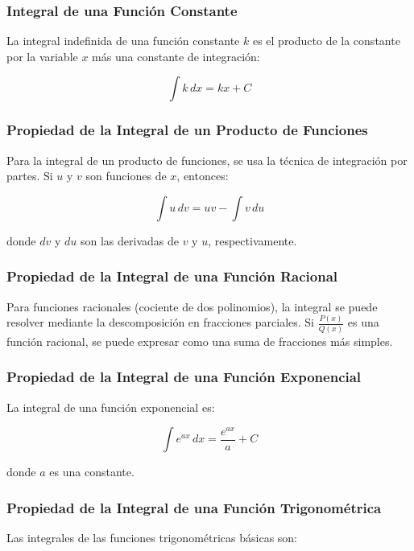 \subsubsection{Integral de una Función Constante}

La integral indefinida de una función constante \( k \) es el producto de la constante por la variable \( x \) más una constante de integración:

\[
\int k \, dx = kx + C
\]

\subsubsection{Propiedad de la Integral de un Producto de Funciones}

Para la integral de un producto de funciones, se usa la técnica de integración por partes. Si \( u \) y \( v \) son funciones de \( x \), entonces:

\[
\int u \, dv = uv - \int v \, du
\]

donde \( dv \) y \( du \) son las derivadas de \( v \) y \( u \), respectivamente.

\subsubsection{Propiedad de la Integral de una Función Racional}

Para funciones racionales (cociente de dos polinomios), la integral se puede resolver mediante la descomposición en fracciones parciales. Si \( \frac{P(x)}{Q(x)} \) es una función racional, se puede expresar como una suma de fracciones más simples.

\subsubsection{Propiedad de la Integral de una Función Exponencial}

La integral de una función exponencial es:

\[
\int e^{ax} \, dx = \frac{e^{ax}}{a} + C
\]

donde \( a \) es una constante.

\subsubsection{Propiedad de la Integral de una Función Trigonométrica}

Las integrales de las funciones trigonométricas básicas son:

